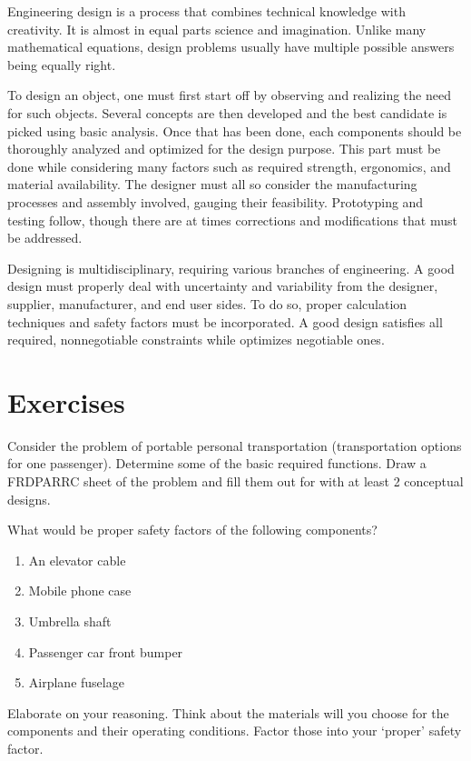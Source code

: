 \documentclass[
10pt,
a4paper,
openany,
svgnames,
]{book}
\newcommand{\exercise}{%
\item \label{lab:\arabic{chapter}.\arabic{exercisesi}}  %
}
\begin{document}
Engineering design is a process that combines technical knowledge with creativity. It is almost in equal parts science and imagination. Unlike many mathematical equations, design problems usually have multiple possible answers being equally right.

To design an object, one must first start off by observing and realizing the need for such objects. Several concepts are then developed and the best candidate is picked using basic analysis. Once that has been done, each components should be thoroughly analyzed and optimized for the design purpose. This part must be done while considering many factors such as required strength, ergonomics, and material availability. The designer must all so consider the manufacturing processes and assembly involved, gauging their feasibility. Prototyping and testing follow, though there are at times corrections and modifications that must be addressed.

Designing is multidisciplinary, requiring various branches of engineering. A good design must properly deal with uncertainty and variability from the designer, supplier, manufacturer, and end user sides. To do so, proper calculation techniques and safety factors must be incorporated. A good design satisfies all required, nonnegotiable constraints while optimizes negotiable ones.

\section*{Exercises}

\begin{exercises}
  
  \exercise Consider the problem of portable personal transportation (transportation options for one passenger). Determine some of the basic required functions. Draw a FRDPARRC sheet of the problem and fill them out for with at least 2 conceptual designs.

  \exercise What would be proper safety factors of the following components?
  \begin{enumerate}
  \item An elevator cable
  \item Mobile phone case
  \item Umbrella shaft
  \item Passenger car front bumper
  \item Airplane fuselage
  \end{enumerate}
  Elaborate on your reasoning. Think about the materials will you choose for the components and their operating conditions. Factor those into your ‘proper’ safety factor.

\end{exercises}
\end{document}
